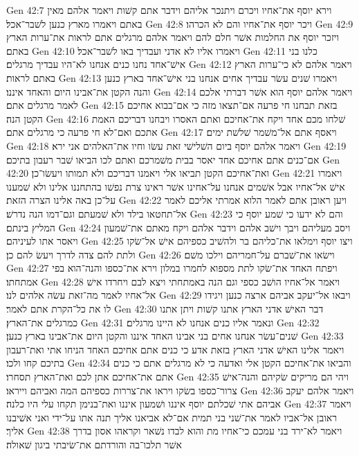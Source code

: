 Gen 42:7  וירא יוסף את־אחיו ויכרם ויתנכר אליהם וידבר אתם קשׁות ויאמר אלהם מאין באתם ויאמרו מארץ כנען לשׁבר־אכל׃
Gen 42:8  ויכר יוסף את־אחיו והם לא הכרהו׃
Gen 42:9  ויזכר יוסף את החלמות אשׁר חלם להם ויאמר אלהם מרגלים אתם לראות את־ערות הארץ באתם׃
Gen 42:10  ויאמרו אליו לא אדני ועבדיך באו לשׁבר־אכל׃
Gen 42:11  כלנו בני אישׁ־אחד נחנו כנים אנחנו לא־היו עבדיך מרגלים׃
Gen 42:12  ויאמר אלהם לא כי־ערות הארץ באתם לראות׃
Gen 42:13  ויאמרו שׁנים עשׂר עבדיך אחים אנחנו בני אישׁ־אחד בארץ כנען והנה הקטן את־אבינו היום והאחד איננו׃
Gen 42:14  ויאמר אלהם יוסף הוא אשׁר דברתי אלכם לאמר מרגלים אתם׃
Gen 42:15  בזאת תבחנו חי פרעה אם־תצאו מזה כי אם־בבוא אחיכם הקטן הנה׃
Gen 42:16  שׁלחו מכם אחד ויקח את־אחיכם ואתם האסרו ויבחנו דבריכם האמת אתכם ואם־לא חי פרעה כי מרגלים אתם׃
Gen 42:17  ויאסף אתם אל־משׁמר שׁלשׁת ימים׃
Gen 42:18  ויאמר אלהם יוסף ביום השׁלישׁי זאת עשׂו וחיו את־האלהים אני ירא׃
Gen 42:19  אם־כנים אתם אחיכם אחד יאסר בבית משׁמרכם ואתם לכו הביאו שׁבר רעבון בתיכם׃
Gen 42:20  ואת־אחיכם הקטן תביאו אלי ויאמנו דבריכם ולא תמותו ויעשׂו־כן׃
Gen 42:21  ויאמרו אישׁ אל־אחיו אבל אשׁמים אנחנו על־אחינו אשׁר ראינו צרת נפשׁו בהתחננו אלינו ולא שׁמענו על־כן באה אלינו הצרה הזאת׃
Gen 42:22  ויען ראובן אתם לאמר הלוא אמרתי אליכם לאמר אל־תחטאו בילד ולא שׁמעתם וגם־דמו הנה נדרשׁ׃
Gen 42:23  והם לא ידעו כי שׁמע יוסף כי המליץ בינתם׃
Gen 42:24  ויסב מעליהם ויבך וישׁב אלהם וידבר אלהם ויקח מאתם את־שׁמעון ויאסר אתו לעיניהם׃
Gen 42:25  ויצו יוסף וימלאו את־כליהם בר ולהשׁיב כספיהם אישׁ אל־שׂקו ולתת להם צדה לדרך ויעשׂ להם כן׃
Gen 42:26  וישׂאו את־שׁברם על־חמריהם וילכו משׁם׃
Gen 42:27  ויפתח האחד את־שׂקו לתת מספוא לחמרו במלון וירא את־כספו והנה־הוא בפי אמתחתו׃
Gen 42:28  ויאמר אל־אחיו הושׁב כספי וגם הנה באמתחתי ויצא לבם ויחרדו אישׁ אל־אחיו לאמר מה־זאת עשׂה אלהים לנו׃
Gen 42:29  ויבאו אל־יעקב אביהם ארצה כנען ויגידו לו את כל־הקרת אתם לאמר׃
Gen 42:30  דבר האישׁ אדני הארץ אתנו קשׁות ויתן אתנו כמרגלים את־הארץ׃
Gen 42:31  ונאמר אליו כנים אנחנו לא היינו מרגלים׃
Gen 42:32  שׁנים־עשׂר אנחנו אחים בני אבינו האחד איננו והקטן היום את־אבינו בארץ כנען׃
Gen 42:33  ויאמר אלינו האישׁ אדני הארץ בזאת אדע כי כנים אתם אחיכם האחד הניחו אתי ואת־רעבון בתיכם קחו ולכו׃
Gen 42:34  והביאו את־אחיכם הקטן אלי ואדעה כי לא מרגלים אתם כי כנים אתם את־אחיכם אתן לכם ואת־הארץ תסחרו׃
Gen 42:35  ויהי הם מריקים שׂקיהם והנה־אישׁ צרור־כספו בשׂקו ויראו את־צררות כספיהם המה ואביהם וייראו׃
Gen 42:36  ויאמר אלהם יעקב אביהם אתי שׁכלתם יוסף איננו ושׁמעון איננו ואת־בנימן תקחו עלי היו כלנה׃
Gen 42:37  ויאמר ראובן אל־אביו לאמר את־שׁני בני תמית אם־לא אביאנו אליך תנה אתו על־ידי ואני אשׁיבנו אליך׃
Gen 42:38  ויאמר לא־ירד בני עמכם כי־אחיו מת והוא לבדו נשׁאר וקראהו אסון בדרך אשׁר תלכו־בה והורדתם את־שׂיבתי ביגון שׁאולה׃
